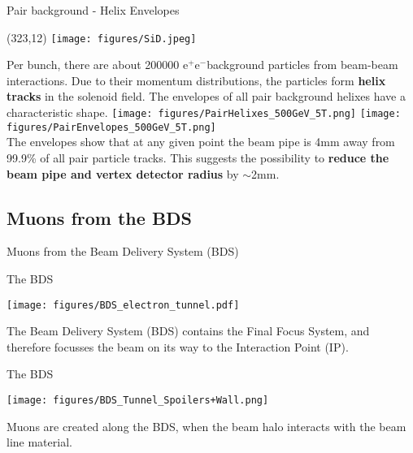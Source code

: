 \documentclass[xcolor={dvipsnames}]{beamer}
\newcommand{\sidlogo}{
  \setlength{\TPHorizModule}{1pt}
  \setlength{\TPVertModule}{1pt}
  \begin{textblock}{1}(323,12)
   \texttt{[image: figures/SiD.jpeg]}
  \end{textblock}
  }
\newcommand{\electron}{e$^-$}
\newcommand{\positron}{e$^+$}
\begin{document}
\begin{frame}{Pair background - Helix Envelopes}
\sidlogo
Per bunch, there are about \num{200000} \positron \electron background particles from beam-beam interactions.
Due to their momentum distributions, the particles form \textbf{helix tracks} in the solenoid field.
The envelopes of all pair background helixes have a characteristic shape.
   \texttt{[image: figures/PairHelixes\_500GeV\_5T.png]}\hspace*{0.1cm}
   \texttt{[image: figures/PairEnvelopes\_500GeV\_5T.png]}\\
The envelopes show that at any given point the beam pipe is 4mm away from 99.9\% of all pair particle tracks.
This suggests the possibility to \textbf{reduce the beam pipe and vertex detector radius} by $\sim$2mm.
\end{frame}

\subsection{Muons from the BDS}
\begin{frame}
 \begin{center}
  \LARGE Muons from the Beam Delivery System (BDS)
 \end{center}

\end{frame}


\begin{frame}{The BDS}
\begin{center}
  \texttt{[image: figures/BDS\_electron\_tunnel.pdf]}
  \end{center}
The Beam Delivery System (BDS) contains the Final Focus System, and therefore focusses the beam on its way to the Interaction Point (IP).
\end{frame}
  \begin{frame}{The BDS}
\begin{center}
  \texttt{[image: figures/BDS\_Tunnel\_Spoilers+Wall.png]}
\end{center}
Muons are created along the BDS, when the beam halo interacts with the beam line material.
\end{frame}
\end{document}
